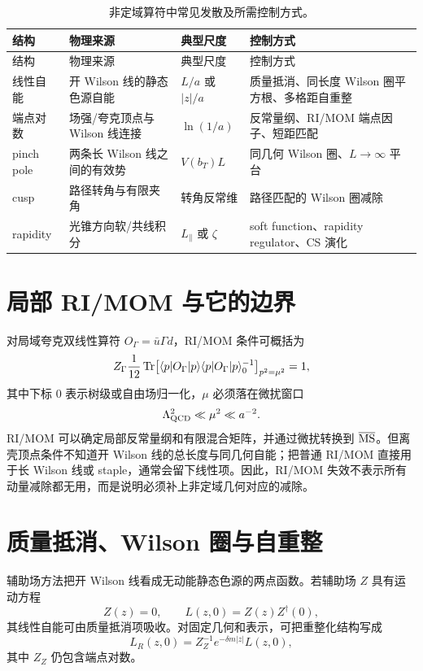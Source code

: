 \begin{longtable}{L{2.3cm}L{3.4cm}L{2.8cm}L{4.0cm}}
\caption{非定域算符中常见发散及所需控制方式。}\label{tab:b01-divergences}\\
\toprule
结构 & 物理来源 & 典型尺度 & 控制方式\\
\midrule
\endfirsthead
\toprule
结构 & 物理来源 & 典型尺度 & 控制方式\\
\midrule
\endhead
线性自能 & 开 Wilson 线的静态色源自能 & \(L/a\) 或 \(|z|/a\) & 质量抵消、同长度 Wilson 圈平方根、多格距自重整\\
端点对数 & 场强/夸克顶点与 Wilson 线连接 & \(\ln(1/a)\) & 反常量纲、RI/MOM 端点因子、短距匹配\\
pinch pole & 两条长 Wilson 线之间的有效势 & \(V(b_T)L\) & 同几何 Wilson 圈、\(L\to\infty\) 平台\\
cusp & 路径转角与有限夹角 & 转角反常维 & 路径匹配的 Wilson 圈减除\\
rapidity & 光锥方向软/共线积分 & \(L_\parallel\) 或 \(\zeta\) & soft function、rapidity regulator、CS 演化\\
\bottomrule
\end{longtable}

\section{局部 RI/MOM 与它的边界}

对局域夸克双线性算符 \(O_\Gamma=\bar u\Gamma d\)，RI/MOM 条件可概括为
\begin{equation}
  Z_\Gamma\frac1{12}\operatorname{Tr}\!\left[
  \langle p|O_\Gamma|p\rangle
  \langle p|O_\Gamma|p\rangle_0^{-1}
  \right]_{p^2=\mu^2}=1,
  \label{eq:ri-mom}
  \end{equation}
其中下标 \(0\) 表示树级或自由场归一化，\(\mu\) 必须落在微扰窗口
\begin{equation}
  \Lambda_{\rm QCD}^2\ll\mu^2\ll a^{-2}.
  \label{eq:perturbative-window}
\end{equation}
RI/MOM 可以确定局部反常量纲和有限混合矩阵，并通过微扰转换到 \(\overline{\mathrm{MS}}\)。但离壳顶点条件不知道开 Wilson 线的总长度与同几何自能；把普通 RI/MOM 直接用于长 Wilson 线或 staple，通常会留下线性项。因此，RI/MOM 失效不表示所有动量减除都无用，而是说明必须补上非定域几何对应的减除。

\section{质量抵消、Wilson 圈与自重整}

辅助场方法把开 Wilson 线看成无动能静态色源的两点函数。若辅助场 \(Z\) 具有运动方程
\begin{equation}
  [\partial_z-ig_0A_z(z)]Z(z)=0,
  \qquad L(z,0)=Z(z)Z^\dagger(0),
  \label{eq:auxiliary-z}
\end{equation}
其线性自能可由质量抵消项吸收。对固定几何和表示，可把重整化结构写成
\begin{equation}
  L_R(z,0)=Z_Z^{-1}e^{-\delta m|z|}L(z,0),
  \label{eq:wilson-renorm}
\end{equation}
其中 \(Z_Z\) 仍包含端点对数。

